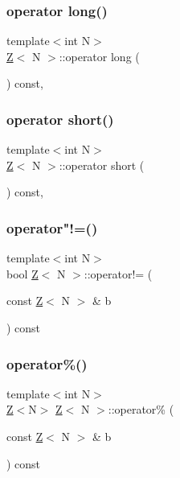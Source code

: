 \subsubsection{\texorpdfstring{operator long()}{operator long()}}
{\footnotesize\ttfamily template$<$int N$>$ \\
\hyperlink{classZ}{Z}$<$ N $>$\+::operator long (\begin{DoxyParamCaption}{ }\end{DoxyParamCaption}) const\hspace{0.3cm}{\ttfamily [inline]}, {\ttfamily [explicit]}}

\mbox{\label{classZ_ab40054217aadcaf96bc394e8593c0d69}} 
\subsubsection{\texorpdfstring{operator short()}{operator short()}}
{\footnotesize\ttfamily template$<$int N$>$ \\
\hyperlink{classZ}{Z}$<$ N $>$\+::operator short (\begin{DoxyParamCaption}{ }\end{DoxyParamCaption}) const\hspace{0.3cm}{\ttfamily [inline]}, {\ttfamily [explicit]}}

\mbox{\label{classZ_a91a2c48fff9d0b4b11e3e7da09c68b7b}} 
\subsubsection{\texorpdfstring{operator"!=()}{operator!=()}}
{\footnotesize\ttfamily template$<$int N$>$ \\
bool \hyperlink{classZ}{Z}$<$ N $>$\+::operator!= (\begin{DoxyParamCaption}\item[{const \hyperlink{classZ}{Z}$<$ N $>$ \&}]{b }\end{DoxyParamCaption}) const\hspace{0.3cm}{\ttfamily [inline]}}

\mbox{\label{classZ_a4715a86eb00c00fce2be3d1c1bf24440}} 
\subsubsection{\texorpdfstring{operator\%()}{operator\%()}}
{\footnotesize\ttfamily template$<$int N$>$ \\
\hyperlink{classZ}{Z}$<$N$>$ \hyperlink{classZ}{Z}$<$ N $>$\+::operator\% (\begin{DoxyParamCaption}\item[{const \hyperlink{classZ}{Z}$<$ N $>$ \&}]{b }\end{DoxyParamCaption}) const\hspace{0.3cm}{\ttfamily [inline]}}

